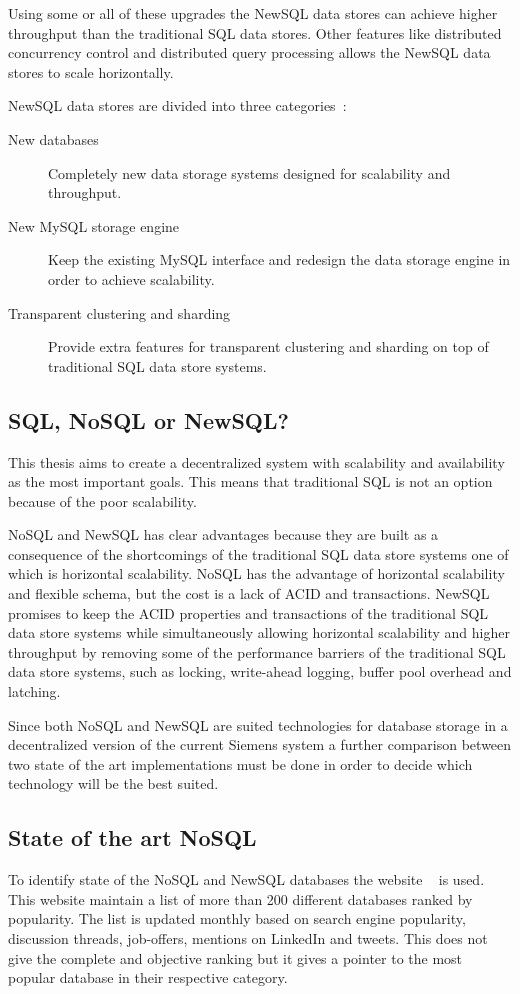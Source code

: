 Using some or all of these upgrades the NewSQL data stores can achieve higher throughput than the traditional SQL data stores.
Other features like distributed concurrency control and distributed query processing allows the NewSQL data stores to scale horizontally.

NewSQL data stores are divided into three categories~\cite{Prasanns:NewSQLTheNewWayToHandleBigData}:

\begin{description}
\item [New databases] Completely new data storage systems designed for scalability and throughput.
\item [New MySQL storage engine] Keep the existing MySQL interface and redesign the data storage engine in order to achieve scalability.
\item [Transparent clustering and sharding] Provide extra features for transparent clustering and sharding on top of traditional SQL data store systems. 
\end{description}

\subsection{SQL, NoSQL or NewSQL?}
This thesis aims to create a decentralized system with scalability and availability as the most important goals.
This means that traditional SQL is not an option because of the poor scalability.

NoSQL and NewSQL has clear advantages because they are built as a consequence of the shortcomings of the traditional SQL data store systems one of which is horizontal scalability.
NoSQL has the advantage of horizontal scalability and flexible schema, but the cost is a lack of ACID and transactions.
NewSQL promises to keep the ACID properties and transactions of the traditional SQL data store systems while simultaneously allowing horizontal scalability and higher throughput by removing some of the performance barriers of the traditional SQL data store systems, such as locking, write-ahead logging, buffer pool overhead and latching.

Since both NoSQL and NewSQL are suited technologies for database storage in a decentralized version of the current Siemens system a further comparison between two state of the art implementations must be done in order to decide which technology will be the best suited.

\subsection{State of the art NoSQL}
To identify state of the NoSQL and NewSQL databases the website ~\cite{db-engines} is used.
This website maintain a list of more than 200 different databases ranked by popularity. The list is updated monthly based on search engine popularity, discussion threads, job-offers, mentions on LinkedIn and tweets. This does not give the complete and objective ranking but it gives a pointer to the most popular database in their respective category.

